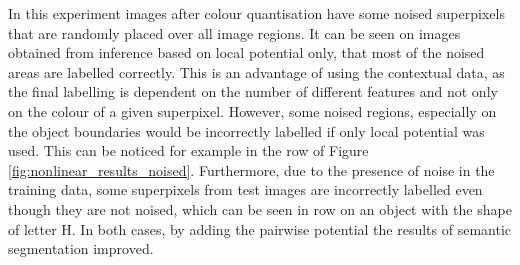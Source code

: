 In this experiment images after colour quantisation have some noised superpixels that are randomly placed over all image regions. It can be seen on images obtained from inference based on local potential only, that most of the noised areas are labelled correctly. This is an advantage of using the contextual data, as the final labelling is dependent on the number of different features and not only on the colour of a given superpixel. However, some noised regions, especially on the object boundaries would be incorrectly labelled if only local potential was used. This can be noticed for example in the  row of Figure \ref{fig:nonlinear_results_noised}. Furthermore, due to the presence of noise in the training data, some superpixels from test images are incorrectly labelled even though they are not noised, which can be seen in  row on an object with the shape of letter H. In both cases, by adding the pairwise potential the results of semantic segmentation improved.
